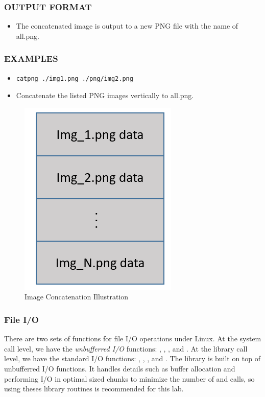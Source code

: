 \subsubsection*{OUTPUT FORMAT}
  \begin{itemize}
  \item[]The concatenated image is output to  a new PNG file with the name of all.png.
  \end{itemize}
\subsubsection*{EXAMPLES}
\begin{itemize}
\item[]
\begin{verbatim}
catpng ./img1.png ./png/img2.png
\end{verbatim}
\item[]Concatenate the listed PNG images vertically to all.png.
\end{itemize}

\begin{figure}[h]
  \centering
  \includegraphics{img/img_concatenation}
  \caption{Image Concatenation Illustration}
\label{fig_img_concatenation}
\end{figure}

\subsubsection{File I/O}
There are two sets of functions for file I/O operations under Linux. At the system call level, we have the {\em unbufferred I/O} functions: , , ,  and . At the library call level, we have the standard I/O functions: , , ,  and . The library is built on top of unbufferred I/O functions. It handles details such as buffer allocation and performing I/O in optimal sized chunks to minimize the number of  and  calls, so using theses library routines is recommended for this lab.


